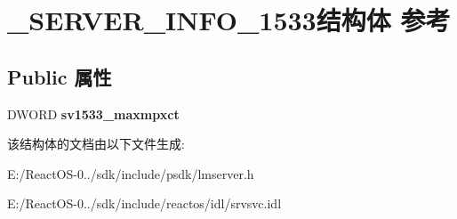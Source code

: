 \hypertarget{struct___s_e_r_v_e_r___i_n_f_o__1533}{}\section{\+\_\+\+S\+E\+R\+V\+E\+R\+\_\+\+I\+N\+F\+O\+\_\+1533结构体 参考}
\label{struct___s_e_r_v_e_r___i_n_f_o__1533}
\subsection*{Public 属性}
\begin{DoxyCompactItemize}
\item 
\mbox{\label{struct___s_e_r_v_e_r___i_n_f_o__1533_a25a9d05be96153c57b245e0fda67e689}} 
D\+W\+O\+RD {\bfseries sv1533\+\_\+maxmpxct}
\end{DoxyCompactItemize}


该结构体的文档由以下文件生成\+:\begin{DoxyCompactItemize}
\item 
E\+:/\+React\+O\+S-\/0../sdk/include/psdk/lmserver.\+h\item 
E\+:/\+React\+O\+S-\/0../sdk/include/reactos/idl/srvsvc.\+idl\end{DoxyCompactItemize}
